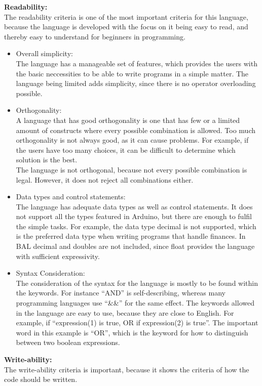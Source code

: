 \textbf{Readability:} \\
The readability criteria is one of the most important criteria for this language, because the language is developed with the focus on it being easy to read, and thereby easy to understand for beginners in programming. \\
\begin{itemize}
\item Overall simplicity:\\
The language has a manageable set of features, which provides the users with the basic neccessities to be able to write programs in a simple matter. The language being limited adds simplicity, since there is no operator overloading possible.
\item Orthogonality:\\
A language that has good orthogonality is one that has few or a limited amount of constructs where every possible combination is allowed. Too much orthogonality is not always good, as it can cause problems. For example, if the users have too many choices, it can be difficult to determine which solution is the best.\\
The language is not orthogonal, because not every possible combination is legal. However, it does not reject all combinations either.  
\item Data types and control statements:\\
The language has adequate data types as well as control statements. It does not support all the types featured in Arduino, but there are enough to fulfil the simple tasks. For example, the data type decimal is not supported, which is the preferred data type when writing programs that handle finances. In BAL decimal and doubles are not included, since float provides the language with sufficient expressivity.
\item Syntax Consideration:\\
The consideration of the syntax for the language is mostly to be found within the keywords. For instance ``AND'' is self-describing, whereas many programming languages use ``\&\&'' for the same effect. The keywords allowed in the language are easy to use, because they are close to English. For example, if ``expression(1) is true, OR if expression(2) is true''. The important word in this example is ``OR'', which is the keyword for how to distinguish between two boolean expressions.
\end{itemize}
\textbf{Write-ability:} \\
The write-ability criteria is important, because it shows the criteria of how the code should be written. 
